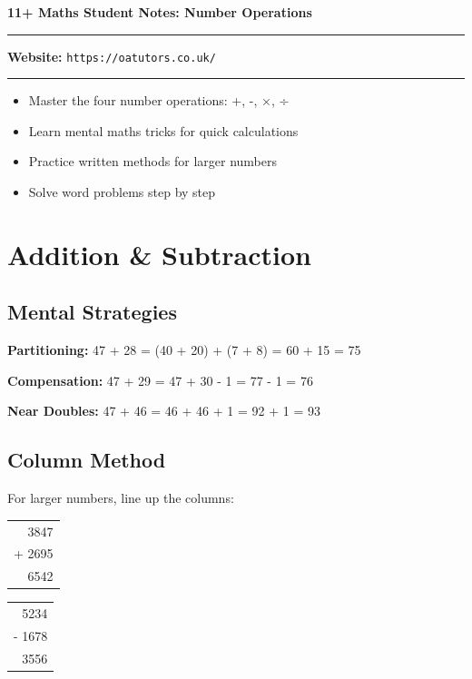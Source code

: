 \documentclass[a4paper,11pt]{article}
\begin{document}
\onehalfspacing


\begin{center}
\textbf{\Large 11+ Maths Student Notes: Number Operations}
\vspace{0.2cm}
\end{center}

\hrule
\vspace{0.1cm}

\textbf{Website:} \texttt{https://oatutors.co.uk/}

\vspace{0.2cm}
\hrule
\vspace{0.3cm}

\begin{tcolorbox}[colback=blue!5!white,colframe=blue!75!black,title=\textbf{What You'll Learn Today}]
\begin{itemize}
    \item Master the four number operations: +, -, ×, ÷
    \item Learn mental maths tricks for quick calculations
    \item Practice written methods for larger numbers
    \item Solve word problems step by step
\end{itemize}
\end{tcolorbox}

\section{Addition \& Subtraction}

\subsection{Mental Strategies}
\begin{tcolorbox}[colback=green!5!white,colframe=green!75!black,title=\textbf{Quick Mental Tricks}]
\textbf{Partitioning:} 47 + 28 = (40 + 20) + (7 + 8) = 60 + 15 = 75

\textbf{Compensation:} 47 + 29 = 47 + 30 - 1 = 77 - 1 = 76

\textbf{Near Doubles:} 47 + 46 = 46 + 46 + 1 = 92 + 1 = 93
\end{tcolorbox}

\subsection{Column Method}
For larger numbers, line up the columns:
\begin{center}
\begin{tabular}{r}
  3847 \\
+ 2695 \\
\hline
  6542
\end{tabular}
\quad\quad\quad
\begin{tabular}{r}
  5234 \\
- 1678 \\
\hline
  3556
\end{tabular}
\end{center}
\end{document}
